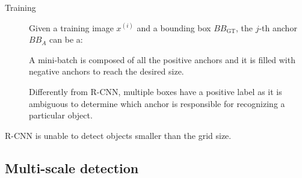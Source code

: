 \begin{description}
\begin{description}
            \begin{description}
                \item[Training]
                    Given a training image $x^{(i)}$ and a bounding box $BB_\text{GT}$, the $j$-th anchor $BB_A$ can be a:

                    A mini-batch is composed of all the positive anchors and it is filled with negative anchors to reach the desired size.

                    \begin{remark}
                        Differently from R-CNN, multiple boxes have a positive label as it is ambiguous to determine which anchor is responsible for recognizing a particular object.
                    \end{remark}
            \end{description}
        \end{description}
\end{description} 

\begin{remark}
    R-CNN is unable to detect objects smaller than the grid size.
\end{remark}


\subsection{Multi-scale detection}

